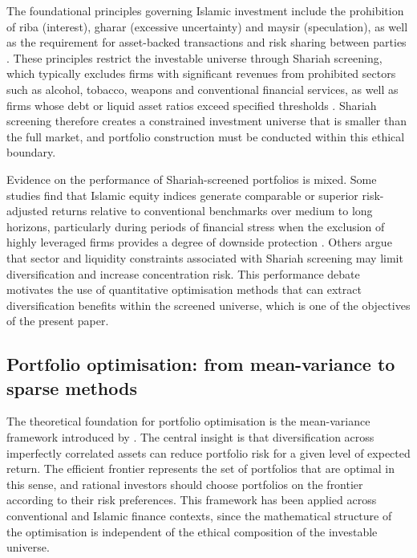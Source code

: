 The foundational principles governing Islamic investment include the prohibition
of riba (interest), gharar (excessive uncertainty) and maysir (speculation), as
well as the requirement for asset-backed transactions and risk sharing between
parties \citep{elgamal2006islamic, ayub2009understanding, iqbal2011islamic}.
These principles restrict the investable universe through Shariah screening, which
typically excludes firms with significant revenues from prohibited sectors such as
alcohol, tobacco, weapons and conventional financial services, as well as firms
whose debt or liquid asset ratios exceed specified thresholds
\citep{hassan2005impact}. Shariah screening therefore creates a constrained
investment universe that is smaller than the full market, and portfolio construction
must be conducted within this ethical boundary.

Evidence on the performance of Shariah-screened portfolios is mixed. Some
studies find that Islamic equity indices generate comparable or superior risk-adjusted
returns relative to conventional benchmarks over medium to long horizons,
particularly during periods of financial stress when the exclusion of highly
leveraged firms provides a degree of downside protection
\citep{hassan2005impact}. Others argue that sector and liquidity constraints
associated with Shariah screening may limit diversification and increase concentration
risk. This performance debate motivates the use of quantitative optimisation
methods that can extract diversification benefits within the screened universe,
which is one of the objectives of the present paper.

\subsection{Portfolio optimisation: from mean-variance to sparse methods}

The theoretical foundation for portfolio optimisation is the mean-variance
framework introduced by \citet{markowitz1952portfolio}. The central insight is
that diversification across imperfectly correlated assets can reduce portfolio risk
for a given level of expected return. The efficient frontier represents the set of
portfolios that are optimal in this sense, and rational investors should choose
portfolios on the frontier according to their risk preferences. This framework
has been applied across conventional and Islamic finance contexts, since the
mathematical structure of the optimisation is independent of the ethical
composition of the investable universe.

